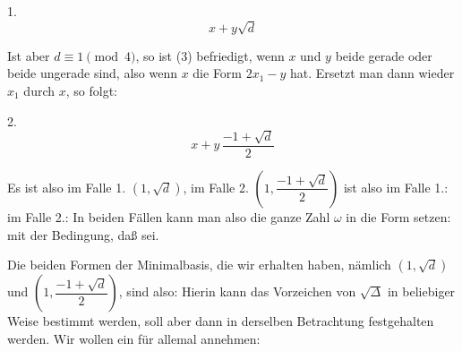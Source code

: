 
1. 
\[
x+y\sqrt{d}
\]

Ist aber $d\equiv 1\pmod 4$, so ist (3) befriedigt, wenn $x$ und $y$
beide gerade oder beide ungerade sind, also wenn $x$ die Form
$2x_1-y$ hat. Ersetzt man dann wieder $x_1$ durch $x$, so folgt:

2. 
\[
x+y\,\frac{-1+\sqrt{d}}{2}
\]

Es ist also im Falle 1. $(1,\sqrt{d})$, im Falle 2. $\left(1,\dfrac{-1+\sqrt{d}}{2}\right)$
 ist also im Falle 1.:
im Falle 2.:
In beiden F\"allen kann man also die ganze Zahl $\omega$ in die
Form setzen:
mit der Bedingung, da\ss
{}
sei.

Die beiden Formen der Minimalbasis, die wir erhalten haben,
n\"amlich $(1,\sqrt{d})$ und $\left(1,\dfrac{-1+\sqrt{d}}{2}\right)$, sind also:
Hierin kann das Vorzeichen von $\sqrt{\varDelta}$ in beliebiger Weise bestimmt werden, soll aber dann in derselben Betrachtung festgehalten werden. Wir wollen ein f\"ur allemal annehmen:
